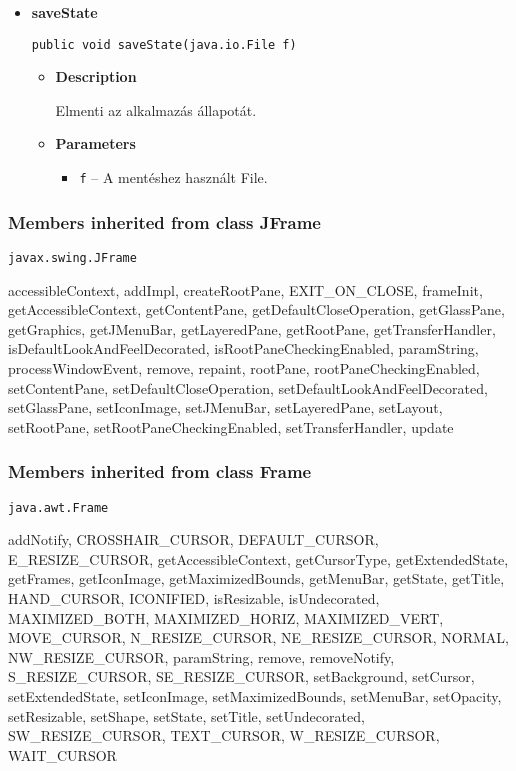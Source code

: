 {{{{{{\begin{itemize}
{\begin{itemize}
{A belépési pont.
}
\item{
{\bf  Parameters}
  \begin{itemize}
   \item{
\texttt{args} -- Az argumentumok.}
  \end{itemize}
}%
\end{itemize}
}%
\item{ 
\hypertarget{main.Main.saveState(java.io.File)}{{\bf  saveState}\\}
\begin{lstlisting}[frame=none]
public void saveState(java.io.File f)\end{lstlisting} %
\begin{itemize}
\item{
{\bf  Description}

Elmenti az alkalmazás állapotát.
}
\item{
{\bf  Parameters}
  \begin{itemize}
   \item{
\texttt{f} -- A mentéshez használt File.}
  \end{itemize}
}%
\end{itemize}
}%
\end{itemize}
}
\subsubsection{Members inherited from class JFrame }{
\texttt{javax.swing.JFrame} {\small 
{}}
{\small 

accessibleContext, addImpl, createRootPane, EXIT\_ON\_CLOSE, frameInit, getAccessibleContext, getContentPane, getDefaultCloseOperation, getGlassPane, getGraphics, getJMenuBar, getLayeredPane, getRootPane, getTransferHandler, isDefaultLookAndFeelDecorated, isRootPaneCheckingEnabled, paramString, processWindowEvent, remove, repaint, rootPane, rootPaneCheckingEnabled, setContentPane, setDefaultCloseOperation, setDefaultLookAndFeelDecorated, setGlassPane, setIconImage, setJMenuBar, setLayeredPane, setLayout, setRootPane, setRootPaneCheckingEnabled, setTransferHandler, update}
\subsubsection{Members inherited from class Frame }{
\texttt{java.awt.Frame} {\small 
{}}
{\small 

addNotify, CROSSHAIR\_CURSOR, DEFAULT\_CURSOR, E\_RESIZE\_CURSOR, getAccessibleContext, getCursorType, getExtendedState, getFrames, getIconImage, getMaximizedBounds, getMenuBar, getState, getTitle, HAND\_CURSOR, ICONIFIED, isResizable, isUndecorated, MAXIMIZED\_BOTH, MAXIMIZED\_HORIZ, MAXIMIZED\_VERT, MOVE\_CURSOR, N\_RESIZE\_CURSOR, NE\_RESIZE\_CURSOR, NORMAL, NW\_RESIZE\_CURSOR, paramString, remove, removeNotify, S\_RESIZE\_CURSOR, SE\_RESIZE\_CURSOR, setBackground, setCursor, setExtendedState, setIconImage, setMaximizedBounds, setMenuBar, setOpacity, setResizable, setShape, setState, setTitle, setUndecorated, SW\_RESIZE\_CURSOR, TEXT\_CURSOR, W\_RESIZE\_CURSOR, WAIT\_CURSOR}
}}}}}}}
